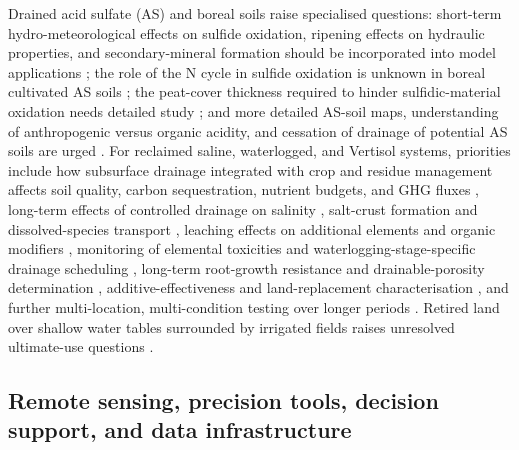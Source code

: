 Drained acid sulfate (AS) and boreal soils raise specialised questions: short-term hydro-meteorological effects on sulfide oxidation, ripening effects on hydraulic properties, and secondary-mineral formation should be incorporated into model applications \parencite{Salo2023}; the role of the N cycle in sulfide oxidation is unknown in boreal cultivated AS soils \parencite{Virtanen2017}; the peat-cover thickness required to hinder sulfidic-material oxidation needs detailed study \parencite{YliHalla2022}; and more detailed AS-soil maps, understanding of anthropogenic versus organic acidity, and cessation of drainage of potential AS soils are urged \parencite{Åström2005}. For reclaimed saline, waterlogged, and Vertisol systems, priorities include how subsurface drainage integrated with crop and residue management affects soil quality, carbon sequestration, nutrient budgets, and GHG fluxes \parencite{Mukhopadhyay2023,Mukhopadhyay2023b}, long-term effects of controlled drainage on salinity \parencite{ElGhannam2023}, salt-crust formation and dissolved-species transport \parencite{Colombani2016}, leaching effects on additional elements and organic modifiers \parencite{SoltaniGerdefaramarzi2020}, monitoring of elemental toxicities and waterlogging-stage-specific drainage scheduling \parencite{Qian2021}, long-term root-growth resistance and drainable-porosity determination \parencite{Bahçeci2018,Bahceci2008}, additive-effectiveness and land-replacement characterisation \parencite{Isa2023}, and further multi-location, multi-condition testing over longer periods \parencite{Sadhukhan2019}. Retired land over shallow water tables surrounded by irrigated fields raises unresolved ultimate-use questions \parencite{Purkey2001}.

\subsection{Remote sensing, precision tools, decision support, and data infrastructure}


